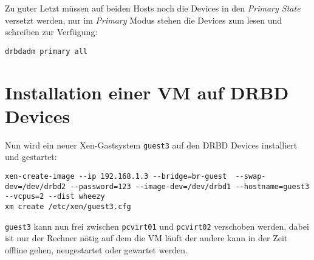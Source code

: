 Zu guter Letzt müssen auf beiden Hosts noch die Devices in den \emph{Primary State} versetzt werden, nur im \emph{Primary} Modus stehen die Devices zum lesen und schreiben zur Verfügung:
\setupVerbatimOut
\begin{verbatim}
drbdadm primary all
\end{verbatim}

\section{Installation einer VM auf DRBD Devices}
Nun wird ein neuer Xen-Gastsystem \verb#guest3# auf den DRBD Devices installiert und gestartet:
\setupVerbatimOut
\begin{verbatim}
xen-create-image --ip 192.168.1.3 --bridge=br-guest  --swap-dev=/dev/drbd2 --password=123 --image-dev=/dev/drbd1 --hostname=guest3 --vcpus=2 --dist wheezy
xm create /etc/xen/guest3.cfg
\end{verbatim}

\verb|guest3| kann nun frei zwischen \verb#pcvirt01# und \verb#pcvirt02# verschoben werden, dabei ist nur der Rechner nötig auf dem die VM läuft der andere kann in der Zeit offline gehen, neugestartet oder gewartet werden.
